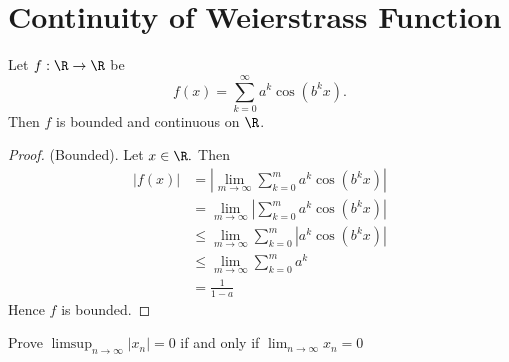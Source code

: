 \documentclass[fontsize=14pt]{scrartcl}
\begin{document}
\section{Continuity of Weierstrass Function}
\begin{theorem}
    Let $f:\R \to \R$ be
    \begin{equation}
        f(x) = \sum_{k=0}^{\infty} a^k \cos(b^k x).
    \end{equation}
    Then $f$ is bounded and continuous on $\R$.
\end{theorem}
\begin{proof}
    (Bounded). Let $x \in \R.$ Then
    \begin{equation}
    \begin{aligned}
        |f(x)| &= |\lim_{m \to \infty} \sum_{k=0}^{m} a^k \cos(b^k x)| \\
               &= \lim_{m \to \infty} |\sum_{k=0}^{m} a^k \cos(b^k x)| \\
               &\leq \lim_{m \to \infty} \sum_{k=0}^{m} |a^k \cos(b^k x)| \\
               &\leq \lim_{m \to \infty} \sum_{k=0}^{m} a^k \\ 
               &= \frac{1}{1-a}
    \end{aligned}
    \end{equation}
    Hence $f$ is bounded.
\end{proof}

\begin{exercise}
    Prove $\limsup_{n \to \infty}|x_n| = 0$ if and only if $\lim_{n \to \infty}x_n = 0$    
\end{exercise}
\end{document}
